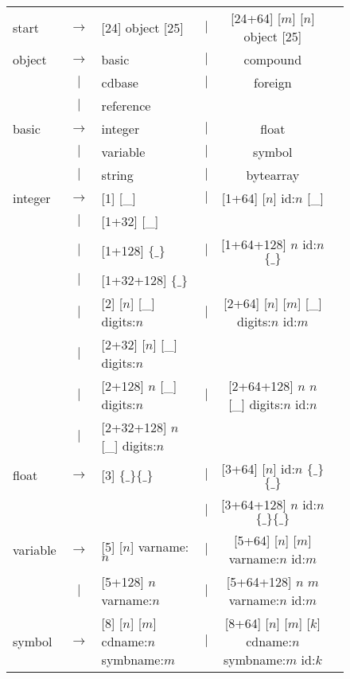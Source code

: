 \def\abyte{[\_]\xspace}\def\fourbytes{\ensuremath{\{\_\}}\xspace}
\begin{figure}\centering\footnotesize
\begin{center}
\begin{tabular}{lcp{6cm}lcp{5cm}}
  start  &  $\longrightarrow$& [24] object [25] 
           &  $|$ &  [24+64] [$m$]  [$n$] object [25]\\
   object  & $\longrightarrow$& basic
      & $|$ &  compound &\\
      & $|$ & cdbase
      & $|$ & foreign \\
      & $|$ & reference &\\
    basic & $\longrightarrow$ &  integer  
      & $|$ &  float \\
      & $|$ &  variable 
      & $|$ &  symbol   \\
      & $|$ &  string 
      & $|$ &  bytearray \\
    integer  & $\longrightarrow$&[1] \abyte 
      & $|$ & [1+64] [$n$] id:$n$ \abyte\\
      & $|$ &  [1+32] \abyte  & &  \\
      & $|$ &  [1+128] \fourbytes 
      &  $|$ & [1+64+128] {$n$} id:$n$ \fourbytes\\
      & $|$ &  [1+32+128] \fourbytes  &
      &  &\\
      & $|$ &  [2] [$n$] \abyte digits:$n$
      & $|$ & [2+64] [$n$] [$m$] \abyte digits:$n$ id:$m$\\
      & $|$ & [2+32] [$n$] \abyte digits:$n$ & 
      &  \\
      & $|$ & [2+128] {$n$} \abyte digits:$n$
      & $|$ & [2+64+128] {$n$} {$n$} \abyte digits:$n$ id:$n$\\
      & $|$ & [2+32+128] {$n$} \abyte digits:$n$
      & & \\
   float  & $\longrightarrow$& [3] \fourbytes\fourbytes 
       & $|$ & [3+64] [$n$] id:$n$ \fourbytes\fourbytes\\
       & &
       & $|$ & [3+64+128] {$n$} id:$n$ \fourbytes\fourbytes\\
    variable  & $\longrightarrow$& [5] [$n$] varname:$n$
       & $|$ & [5+64] [$n$] [$m$] varname:$n$ id:$m$\\
       & $|$ & [5+128] {$n$} varname:$n$
       & $|$ & [5+64+128] {$n$} {$m$} varname:$n$ id:$m$\\
    symbol & $\longrightarrow$& [8] [$n$] [$m$] cdname:$n$ symbname:$m$
       & $|$ & [8+64] [$n$] [$m$] [$k$] cdname:$n$ symbname:$m$ id:$k$\\

\end{tabular}
\end{center}
\end{figure}
